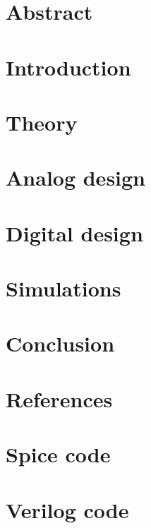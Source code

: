 \documentclass[a4paper, 11pt, english]{article}
\begin{document}
% 


\newpage
\section{Abstract} \label{sec:Abstract}


\section{Introduction} \label{sec:Introduction}


\newpage
\section{Theory} \label{sec:Theory}


\newpage
\section{Analog design} \label{sec:AnalogDesign}


\newpage
\section{Digital design} \label{sec:DigitalDesign}


\newpage
\section{Simulations} \label{sec:Simulations}


\newpage
\section{Conclusion} \label{sec:Conclusion}


\newpage
\section{References} \label{sec:References}
\printbibliography



\newpage
\begin{appendices}
  
  
  \section{Spice code} \label{ap:SpiceCode}
  
  \newpage
  \section{Verilog code} \label{ap:VerilogCode}
  
\end{appendices}
\end{document}
